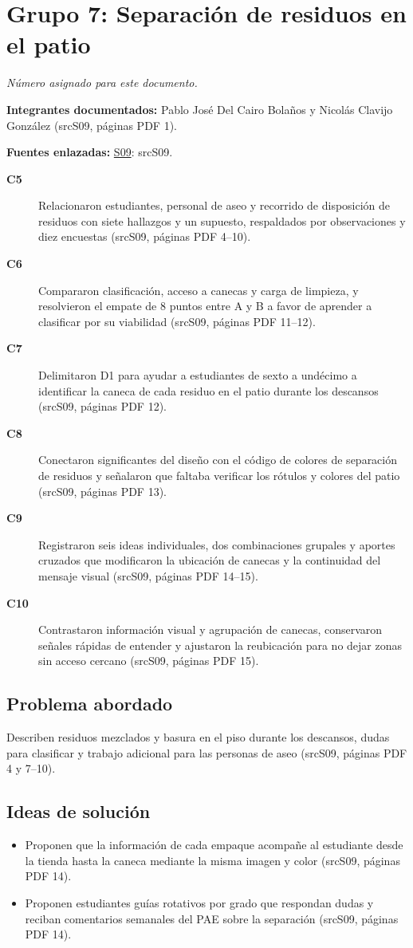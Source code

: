 \documentclass[11pt,a4paper]{article}
\newcommand{\evid}[2]{(\csname src#1\endcsname, páginas PDF #2)}
\begin{document}
\section*{Grupo 7: Separación de residuos en el patio}
\textit{Número asignado para este documento.}

\textbf{Integrantes documentados:} Pablo José Del Cairo Bolaños y Nicolás Clavijo González \evid{S09}{1}.

\textbf{Fuentes enlazadas:} \hyperlink{fuente-S09}{S09}: \csname srcS09\endcsname.

\begin{description}
\item[\textbf{C5}] Relacionaron estudiantes, personal de aseo y recorrido de disposición de residuos con siete hallazgos y un supuesto, respaldados por observaciones y diez encuestas \evid{S09}{4--10}.
\item[\textbf{C6}] Compararon clasificación, acceso a canecas y carga de limpieza, y resolvieron el empate de 8 puntos entre A y B a favor de aprender a clasificar por su viabilidad \evid{S09}{11--12}.
\item[\textbf{C7}] Delimitaron D1 para ayudar a estudiantes de sexto a undécimo a identificar la caneca de cada residuo en el patio durante los descansos \evid{S09}{12}.
\item[\textbf{C8}] Conectaron significantes del diseño con el código de colores de separación de residuos y señalaron que faltaba verificar los rótulos y colores del patio \evid{S09}{13}.
\item[\textbf{C9}] Registraron seis ideas individuales, dos combinaciones grupales y aportes cruzados que modificaron la ubicación de canecas y la continuidad del mensaje visual \evid{S09}{14--15}.
\item[\textbf{C10}] Contrastaron información visual y agrupación de canecas, conservaron señales rápidas de entender y ajustaron la reubicación para no dejar zonas sin acceso cercano \evid{S09}{15}.
\end{description}
\subsection*{Problema abordado}
Describen residuos mezclados y basura en el piso durante los descansos, dudas para clasificar y trabajo adicional para las personas de aseo \evid{S09}{4 y 7--10}.
\subsection*{Ideas de solución}
\begin{itemize}
\item Proponen que la información de cada empaque acompañe al estudiante desde la tienda hasta la caneca mediante la misma imagen y color \evid{S09}{14}.
\item Proponen estudiantes guías rotativos por grado que respondan dudas y reciban comentarios semanales del PAE sobre la separación \evid{S09}{14}.
\end{itemize}
\clearpage
\end{document}
